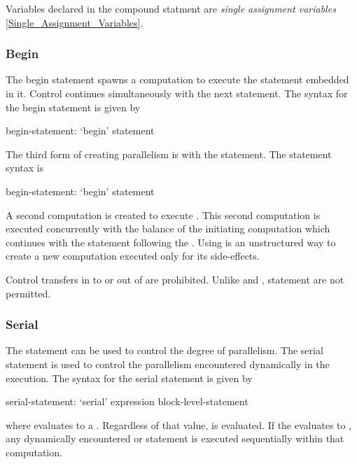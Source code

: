 Variables declared in the  compound statment are {\em single
assignment variables} \ref{Single_Assignment_Variables}. 

\subsubsection{Begin}
\label{Begin}

The begin statement spawns a computation to execute the statement
embedded in it.  Control continues simultaneously with the next
statement.  The syntax for the begin statement is given by
\begin{syntax}
begin-statement:
  `begin' statement
\end{syntax}

The third form of creating parallelism is with the 
statement. The  statement syntax is
\begin{syntax}
begin-statement:
  `begin' statement
\end{syntax}
A second computation is created to execute .
This second computation is executed concurrently with the balance of
the initiating computation which continues with the statement
following the . Using  is an unstructured way to 
create a new computation executed only for its side-effects.

Control transfers in to or out of  are prohibited. Unlike
 and ,  statement are not permitted.


\subsubsection{Serial}
\label{Serial}

The  statement can be used to control the degree of parallelism.
The serial statement is used to control the parallelism encountered
dynamically in the execution.  The syntax for the serial statement is
given by
\begin{syntax}
serial-statement:
  `serial' expression block-level-statement
\end{syntax}
where  evaluates to a .  Regardless of
that value,  is evaluated. If
the  evaluates to , any dynamically
encountered  or  statement is executed
sequentially within that computation.



